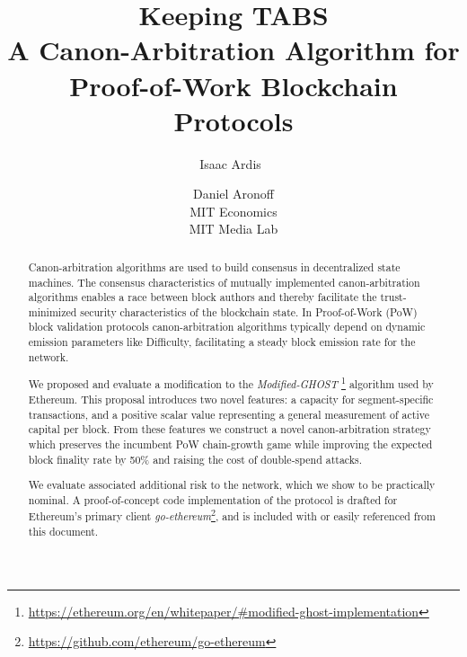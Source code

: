 \documentclass[11pt]{article}
\title{\textbf{Keeping TABS}\\
\small{A Canon-Arbitration Algorithm for \mghost Proof-of-Work Blockchain Protocols}}
\author{Isaac Ardis\
\and Daniel Aronoff\\\small{MIT Economics}\\\small{MIT Media Lab}}
\theoremstyle{plain}
\newcommand{\mghost}{\textit{Modified-GHOST }}
\begin{document}

\maketitle
\begin{abstract}

Canon-arbitration algorithms are used to build consensus in decentralized
state machines.
The consensus characteristics of mutually implemented canon-arbitration
algorithms enables a race between block authors and thereby facilitate
the trust-minimized security characteristics of the blockchain state.
In Proof-of-Work (PoW) block validation protocols canon-arbitration
algorithms typically depend on dynamic emission parameters like Difficulty,
facilitating a steady block emission rate for the network.

We proposed and evaluate a modification to the \mghost\footnote{
    \url{https://ethereum.org/en/whitepaper/#modified-ghost-implementation}}
algorithm used by Ethereum.
This proposal introduces two novel features: a capacity for segment-specific
transactions, and a positive scalar value representing a general measurement of
active capital per block.
From these features we construct a novel canon-arbitration strategy
which preserves the incumbent PoW chain-growth game
while improving the expected block finality rate by 50\%
and raising the cost of double-spend attacks.

We evaluate associated additional risk to the network,
which we show to be practically nominal.
A proof-of-concept code implementation of the protocol is drafted
for Ethereum's primary client \textit{go-ethereum}\footnote{
    \url{https://github.com/ethereum/go-ethereum}},
and is included with or easily referenced from this document.




\end{abstract}
\end{document}
